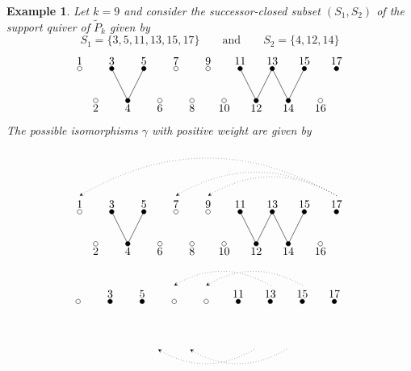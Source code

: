 \documentclass{amsart}
\newtheorem{example}[theorem]{Example}
\numberwithin{equation}{section}
\begin{document}
  \begin{example}
    Let $k=9$ and consider the successor-closed subset $(S_1,S_2)$ of the support quiver of $\tilde P_k$ given by
    \[S_1=\{3,5,11,13,15,17\}\qquad\text{and}\qquad S_2=\{4,12,14\}\]
    \[
      \begin{tikzpicture}
        \foreach \i in {3,5,11,13,15,17}{
          \draw[fill=black] (0.5*\i,1) circle (2pt);
          \node[above] at (0.5*\i,1) {\i};} 
        \foreach \i in {1,7,9}{
          \draw[fill=white] (0.5*\i,1) circle (2pt);
          \node[above] at (0.5*\i,1) {\i};} 
        \foreach \i in {4,12,14}{
          \draw[fill=black] (0.5*\i,0) circle (2pt);
          \draw (0.5*\i,0) -- (0.5*\i-0.5,1);
          \draw (0.5*\i,0) -- (0.5*\i+0.5,1);
          \node[below] at (0.5*\i,0) {\i};} 
        \foreach \i in {2,6,8,10,16}{
          \draw[fill=white] (0.5*\i,0) circle (2pt);
          \node[below] at (0.5*\i,0) {\i};} 
      \end{tikzpicture}
    \]
    The possible isomorphisms $\gamma$ with positive weight are given by
    \[
      \begin{tikzpicture}
        \draw[dotted,-stealth] (8.5,1.5) to[out=150,in=30] (0.5,1.5);
        \draw[dotted,-stealth] (8.5,1.5) to[out=150,in=30] (3.5,1.5);
        \draw[dotted,-stealth] (8.5,1.5) to[out=150,in=30] (4.5,1.5);
        \foreach \i in {3,5,11,13,15,17}{
          \draw[fill=black] (0.5*\i,1) circle (2pt);
          \node[above] at (0.5*\i,1) {\i};} 
        \foreach \i in {1,7,9}{
          \draw[fill=white] (0.5*\i,1) circle (2pt);
          \node[above] at (0.5*\i,1) {\i};} 
        \foreach \i in {4,12,14}{
          \draw[fill=black] (0.5*\i,0) circle (2pt);
          \draw (0.5*\i,0) -- (0.5*\i-0.5,1);
          \draw (0.5*\i,0) -- (0.5*\i+0.5,1);
          \node[below] at (0.5*\i,0) {\i};} 
        \foreach \i in {2,6,8,10,16}{
          \draw[fill=white] (0.5*\i,0) circle (2pt);
          \node[below] at (0.5*\i,0) {\i};} 
      \end{tikzpicture}
    \]
    \[
      \begin{tikzpicture}
        \draw[dotted,-stealth] (6.5,1.5) to[out=150,in=30] (3.5,1.5);
        \draw[dotted,-stealth] (7.5,1.5) to[out=150,in=30] (4.5,1.5);
        \draw[dotted,-stealth] (6,-0.5) to[out=210,in=-30] (3,-0.5);
        \draw[dotted,-stealth] (7,-0.5) to[out=210,in=-30] (4,-0.5);
        \foreach \i in {3,5,11,13,15,17}{
          \draw[fill=black] (0.5*\i,1) circle (2pt);
          \node[above] at (0.5*\i,1) {\i};} 
        \foreach \i in {1,7,9}{
          \draw[fill=white] (0.5*\i,1) circle (2pt);
}
\end{tikzpicture}\]
\end{example}
\end{document}
